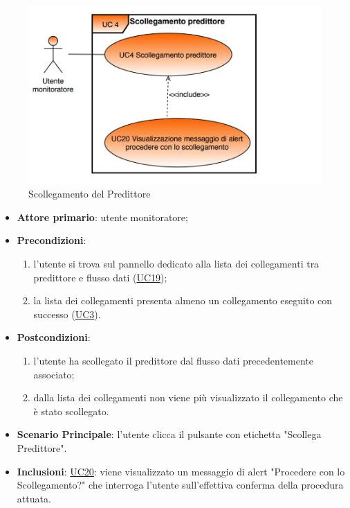 		\begin{figure}[H]
		\centering
		\includegraphics[scale=0.80]{../Analisi_dei_requisiti/img/Diagrammi_UML/UC4_Scollegamento_predittore.png}
		\caption{Scollegamento del Predittore}
		\end{figure}	

		\begin{itemize}
			\item\textbf{Attore primario}: utente monitoratore;
			\item\textbf{Precondizioni}: 
				\begin{enumerate}
					\item l'utente si trova sul pannello dedicato alla lista dei collegamenti tra predittore e flusso dati (\hyperref[par:UC19]{UC19});
					\item la lista dei collegamenti presenta almeno un collegamento eseguito con successo  (\hyperref[par:UC3]{UC3}).
				\end{enumerate}
			\item\textbf{Postcondizioni}: 
				\begin{enumerate}
					\item l’utente ha scollegato il predittore dal flusso dati precedentemente associato; 
					\item dalla lista dei collegamenti non viene più visualizzato il collegamento che è stato scollegato.
				\end{enumerate}
			\item\textbf{Scenario Principale}: l'utente clicca il pulsante con etichetta "Scollega Predittore".
			\item\textbf{Inclusioni}: \hyperref[par:UC20]{UC20}: viene visualizzato un messaggio di alert "Procedere con lo  Scollegamento?" che interroga l'utente sull'effettiva conferma della procedura attuata. 
		\end{itemize}	


